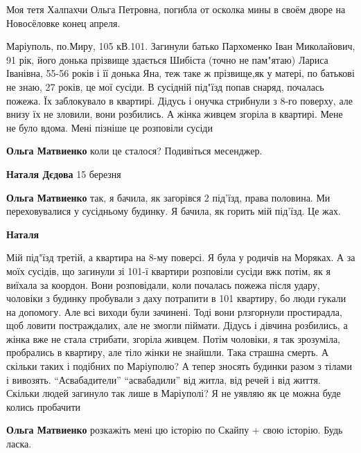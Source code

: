 \begin{multicols}{2}
\begin{itemize}

Моя тетя Халпахчи Ольга Петровна, погибла от осколка мины в своём дворе на
Новосёловке конец апреля.


Маріуполь, по.Миру, 105 кВ.101. Загинули батько Пархоменко Іван Миколайович, 91
рік, його донька прізвище здається Шибіста (точно не пам"ятаю) Лариса Іванівна,
55-56 років і її донька Яна, теж таке ж прізвище,як у матері, по батькові не
знаю, 27 років, це мої сусіди. В сусідній під"їзд попав снаряд, почалась
пожежа. Їх заблокувало в квартирі. Дідусь і онучка стрибнули з 8-го поверху,
але внизу їх не зловили, вони розбились. А жінка живцем згоріла в квартирі.
Мене не було вдома. Мені пізніше це розповіли сусіди

\begin{itemize} %
\textbf{Ольга Матвиенко} коли це сталося?
Подивіться месенджер.

\textbf{Наталя Дєдова} 15 березня

\textbf{Ольга Матвиенко} так, я бачила, як загорівся 2 під'їзд, права половина. Ми переховувалися у сусідньому будинку. Я бачила, як горить мій під'їзд. Це жах.

\textbf{Наталя} 

Мій під"їзд третій, а квартира на 8-му поверсі. Я була у родичів на Моряках. А
за моїх сусідів, що загинули зі 101-ї квартири розповіли сусіди вжк потім, як я
виїхала за коордон. Вони розповідали, коли почалась пожежа після удару,
чоловіки з будинку пробували з даху потрапити в 101 квартиру, бо люди гукали на
допомогу. Але всі виходи були зачинені. Тоді вони рлзгорнули простирадла, щоб
ловити постраждалих, але не змогли піймати. Дідусь і дівчина розбились, а жінка
вже не стала стрибати, згоріла живцем. Потім чоловіки, я так зрозуміла,
пробрались в квартиру, але тіло жінки не знайшли. Така страшна смерть. А
скільки таких і подібних по Маріуполю? А тепер зносять будинки разом з тілами і
вивозять. \enquote{Асвабадители} \enquote{асвабадили} від житла, від речей і від життя. Скільки
людей загинуло так лише в Маріуполі? Я не уявляю як це можна буде колись
пробачити

\textbf{Ольга Матвиенко} розкажіть мені цю історію по Скайпу + свою історію. Будь ласка.
\end{itemize} %



\end{itemize}
\end{multicols}
